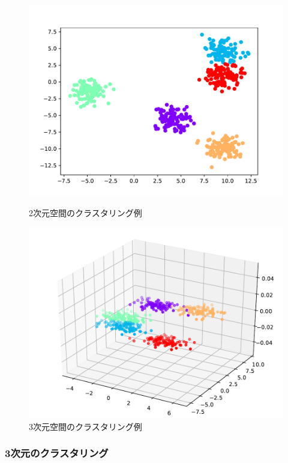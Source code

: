 \begin{figure}[htbp]
  \begin{minipage}{0.5\hsize}
    \begin{center}
      \includegraphics[width=0.9\linewidth]{./img/BIC_2.pdf}
      \caption{2次元空間のクラスタリング例}
      \label{fig:2dim}
    \end{center}
  \end{minipage}
  \begin{minipage}{0.5\hsize}
    \begin{center}
      \includegraphics[width=0.9\linewidth]{./img/BIC_3.pdf}
      \caption{3次元空間のクラスタリング例}
      \label{fig:3dim}
    \end{center}
  \end{minipage}
\end{figure}

\subsubsection{3次元のクラスタリング}

